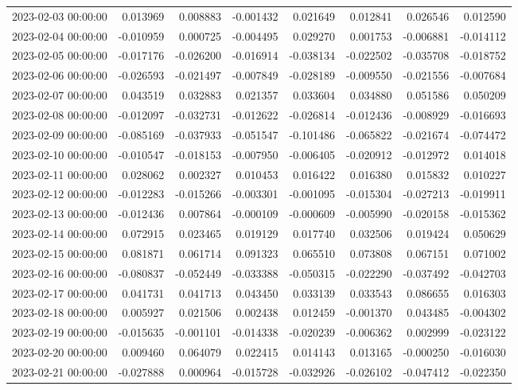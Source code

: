 \begin{tabular}{lrrrrrrr}
2023-02-03 00:00:00 & 0.013969 & 0.008883 & -0.001432 & 0.021649 & 0.012841 & 0.026546 & 0.012590 \\
2023-02-04 00:00:00 & -0.010959 & 0.000725 & -0.004495 & 0.029270 & 0.001753 & -0.006881 & -0.014112 \\
2023-02-05 00:00:00 & -0.017176 & -0.026200 & -0.016914 & -0.038134 & -0.022502 & -0.035708 & -0.018752 \\
2023-02-06 00:00:00 & -0.026593 & -0.021497 & -0.007849 & -0.028189 & -0.009550 & -0.021556 & -0.007684 \\
2023-02-07 00:00:00 & 0.043519 & 0.032883 & 0.021357 & 0.033604 & 0.034880 & 0.051586 & 0.050209 \\
2023-02-08 00:00:00 & -0.012097 & -0.032731 & -0.012622 & -0.026814 & -0.012436 & -0.008929 & -0.016693 \\
2023-02-09 00:00:00 & -0.085169 & -0.037933 & -0.051547 & -0.101486 & -0.065822 & -0.021674 & -0.074472 \\
2023-02-10 00:00:00 & -0.010547 & -0.018153 & -0.007950 & -0.006405 & -0.020912 & -0.012972 & 0.014018 \\
2023-02-11 00:00:00 & 0.028062 & 0.002327 & 0.010453 & 0.016422 & 0.016380 & 0.015832 & 0.010227 \\
2023-02-12 00:00:00 & -0.012283 & -0.015266 & -0.003301 & -0.001095 & -0.015304 & -0.027213 & -0.019911 \\
2023-02-13 00:00:00 & -0.012436 & 0.007864 & -0.000109 & -0.000609 & -0.005990 & -0.020158 & -0.015362 \\
2023-02-14 00:00:00 & 0.072915 & 0.023465 & 0.019129 & 0.017740 & 0.032506 & 0.019424 & 0.050629 \\
2023-02-15 00:00:00 & 0.081871 & 0.061714 & 0.091323 & 0.065510 & 0.073808 & 0.067151 & 0.071002 \\
2023-02-16 00:00:00 & -0.080837 & -0.052449 & -0.033388 & -0.050315 & -0.022290 & -0.037492 & -0.042703 \\
2023-02-17 00:00:00 & 0.041731 & 0.041713 & 0.043450 & 0.033139 & 0.033543 & 0.086655 & 0.016303 \\
2023-02-18 00:00:00 & 0.005927 & 0.021506 & 0.002438 & 0.012459 & -0.001370 & 0.043485 & -0.004302 \\
2023-02-19 00:00:00 & -0.015635 & -0.001101 & -0.014338 & -0.020239 & -0.006362 & 0.002999 & -0.023122 \\
2023-02-20 00:00:00 & 0.009460 & 0.064079 & 0.022415 & 0.014143 & 0.013165 & -0.000250 & -0.016030 \\
2023-02-21 00:00:00 & -0.027888 & 0.000964 & -0.015728 & -0.032926 & -0.026102 & -0.047412 & -0.022350 \\

\end{tabular}
